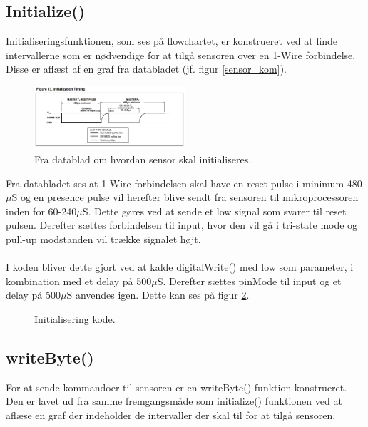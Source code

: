 \newpage
\subsection{Initialize()}
Initialiseringsfunktionen, som ses på flowchartet, er konstrueret ved at finde intervallerne som er nødvendige for at tilgå sensoren over en 1-Wire forbindelse. Disse er aflæst af en graf fra databladet (jf. figur \ref{sensor_kom}).




\begin{figure}[h!]
  \centering
  \includegraphics[width=0.5\textwidth]{figures/Initialization_timing.png}
  \caption{Fra datablad om hvordan sensor skal initialiseres.}
  \label{sensor_init}
\end{figure}

Fra databladet ses at 1-Wire forbindelsen skal have en reset pulse i minimum 480$\mu$S og en presence pulse vil herefter blive sendt fra sensoren til mikroprocessoren inden for 60-240$\mu$S. Dette gøres ved at sende et low signal som svarer til reset pulsen. Derefter sættes forbindelsen til input, hvor den vil gå i tri-state mode og pull-up modstanden vil trække signalet højt. 
\\
\\
I koden bliver dette gjort ved at kalde digitalWrite() med low som parameter, i kombination med et delay på 500$\mu$S. Derefter sættes pinMode til input og et delay på 500$\mu$S anvendes igen. Dette kan ses på figur \ref{sensor_kode}.

\begin{figure}[h!]
  \centering
  \caption{Initialisering kode.}
  \label{sensor_kode}
\end{figure}

\subsection{writeByte()}
For at sende kommandoer til sensoren er en writeByte() funktion konstrueret. Den er lavet ud fra samme fremgangsmåde som initialize() funktionen ved at aflæse en graf der indeholder de intervaller der skal til for at tilgå sensoren.

